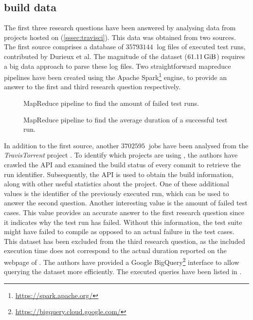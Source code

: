 
\subsection{\travisci{} build data}
The first three research questions have been answered by analysing data from projects hosted on \travisci{} (\cref{sssec:travisci}). This data was obtained from two sources.\\

\noindent The first source comprises a database \cite{travisanalysis} of $\SI{35793144}{}$ log files of executed test runs, contributed by Durieux et al. The magnitude of the dataset ($\SI{61.11}{\gibi\byte}$) requires a big data approach to parse these log files. Two straightforward \Gls{mapreduce} pipelines have been created using the Apache Spark\footnote{\url{https://spark.apache.org/}} engine, to provide an answer to the first and third research question respectively.\\


\begin{figure}[htbp!]
	\centering
	
	\caption{MapReduce pipeline to find the amount of failed test runs.}
	\label{fig:eval-mapreduce-1}
\end{figure}

\begin{figure}[htbp!]
	\centering
	
	\caption{MapReduce pipeline to find the average duration of a successful test run.}
	\label{fig:eval-mapreduce-2}
\end{figure}

\noindent In addition to the first source, another $\SI{3702595}{}$ jobs have been analysed from the \mbox{\emph{TravisTorrent}} project \cite{msr17challenge}. To identify which projects are using \travisci{}, the authors have crawled the \github{} API and examined the build status of every commit to retrieve the run identifier. Subsequently, the \travisci{} API is used to obtain the build information, along with other useful statistics about the project. One of these additional values is the identifier of the previously executed run, which can be used to answer the second question. Another interesting value is the amount of failed test cases. This value provides an accurate answer to the first research question since it indicates why the test run has failed. Without this information, the test suite might have failed to compile as opposed to an actual failure in the test cases. This dataset has been excluded from the third research question, as the included execution time does not correspond to the actual duration reported on the webpage of \travisci{}. The authors have provided a Google BigQuery\footnote{\url{https://bigquery.cloud.google.com/}} interface to allow querying the dataset more efficiently. The executed queries have been listed in .